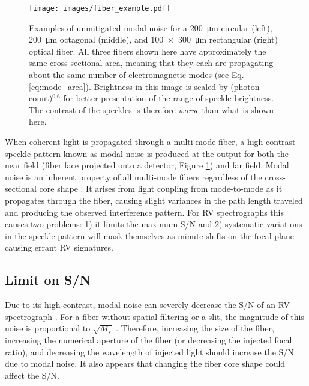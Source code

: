 \documentclass[twocolumn]{emulateapj}
\begin{document}
\begin{figure}
\centering
	\texttt{[image: images/fiber\_example.pdf]}
	\caption{Examples of unmitigated modal noise for a \SI{200}{\micro\meter} circular (left), \SI{200}{\micro\meter} octagonal (middle), and \SI{100x300}{\micro\meter} rectangular (right) optical fiber. All three fibers shown here have approximately the same cross-sectional area, meaning that they each are propagating about the same number of electromagnetic modes (see Eq. \ref{eq:mode_area}). Brightness in this image is scaled by (photon count)$^{0.6}$ for better presentation of the range of speckle brightness. The contrast of the speckles is therefore \textit{worse} than what is shown here.}
\label{fig:fiber_example}
\end{figure}

When coherent light is propagated through a multi-mode fiber, a high contrast speckle pattern known as modal noise is produced at the output for both the near field (fiber face projected onto a detector, Figure \ref{fig:fiber_example}) and far field. Modal noise is an inherent property of all multi-mode fibers regardless of the cross-sectional core shape \citep{Sablowski2015}. It arises from light coupling from mode-to-mode as it propagates through the fiber, causing slight variances in the path length traveled and producing the observed interference pattern. For RV spectrographs this causes two problems: 1) it limits the maximum S/N and 2) systematic variations in the speckle pattern will mask themselves as minute shifts on the focal plane causing errant RV signatures.

\subsection{Limit on S/N}

Due to its high contrast, modal noise can severely decrease the S/N of an RV spectrograph \citep{Epworth1978, Baudrand2001, Lemke2011, Iuzzolino2014}. For a fiber without spatial filtering or a slit, the magnitude of this noise is proportional to $\sqrt{M_s}$ \citep{Goodman1981}. Therefore, increasing the size of the fiber, increasing the numerical aperture of the fiber (or decreasing the injected focal ratio), and decreasing the wavelength of injected light should increase the S/N due to modal noise. It also appears that changing the fiber core shape could affect the S/N.
\end{document}
